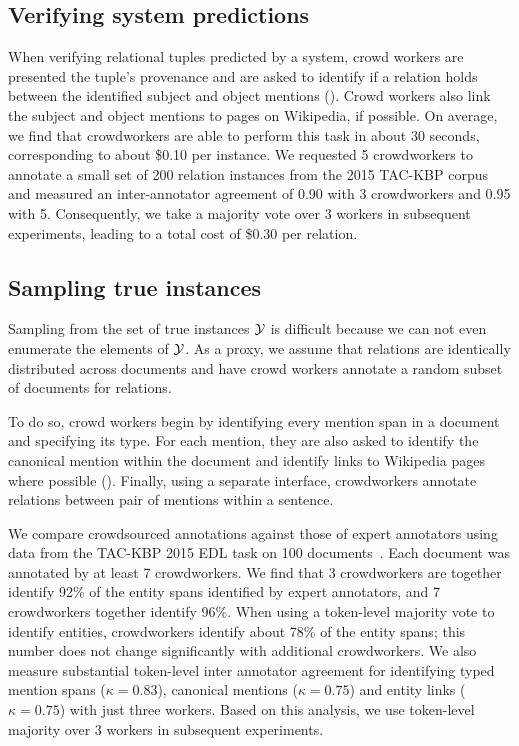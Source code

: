 \subsection{Verifying system predictions}
When verifying relational tuples predicted by a system, 
  crowd workers are presented the tuple's provenance and are asked to identify if a relation holds between the identified subject and object mentions (). 
  Crowd workers also link the subject and object mentions to pages on Wikipedia, if possible.
On average, we find that crowdworkers are able to perform this task in about 30 seconds, corresponding to about \$0.10 per instance.
We requested 5 crowdworkers to annotate a small set of 200 relation instances from the 2015 TAC-KBP corpus 
and measured an inter-annotator agreement of 0.90 with 3 crowdworkers and 0.95 with 5.
Consequently, we take a majority vote over 3 workers in subsequent experiments, leading to a total cost of \$0.30 per relation.

\subsection{Sampling true instances}
Sampling from the set of true instances $\mathcal{Y}$ is difficult because we can not even enumerate the elements of $\mathcal{Y}$.
As a proxy, we assume that relations are identically distributed across documents and have crowd workers annotate a random subset of documents for relations.

To do so, crowd workers begin by identifying every mention span in a document and specifying its type.
  For each mention, they are also asked to identify the canonical mention within the document
  and identify links to Wikipedia pages where possible ().
Finally, using a separate interface, crowdworkers annotate relations between pair of mentions within a sentence.

We compare crowdsourced annotations against those of expert annotators using data from the TAC-KBP 2015 EDL task on 100 documents~\citep{}.
Each document was annotated by at least 7 crowdworkers.
We find that 3 crowdworkers are together identify 92\% of the entity spans identified by expert annotators,
  and 7 crowdworkers together identify 96\%.
When using a token-level majority vote to identify entities, crowdworkers identify about 78\% of the entity spans; this number does not change significantly with additional crowdworkers.
We also measure substantial token-level inter annotator agreement for identifying typed mention spans ($\kappa = 0.83$), canonical mentions ($\kappa = 0.75$) and entity links ($\kappa = 0.75$) with just three workers.
Based on this analysis, we use token-level majority over 3 workers in subsequent experiments.

